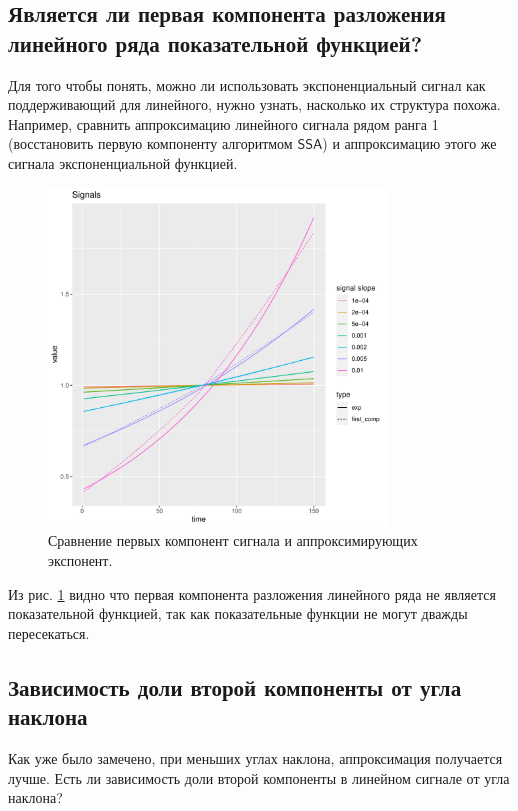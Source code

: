 \documentclass[specialist, substylefile = spbureport.rtx,
    subf,href,colorlinks=true, 12pt]{disser}
\newcommand{\SSA}{\mathsf{SSA}}
\begin{document}
    \subsection{Является ли первая компонента разложения линейного ряда показательной функцией?}
        Для того чтобы понять, можно ли использовать экспоненциальный сигнал как поддерживающий для линейного, нужно узнать, насколько их структура похожа. Например, сравнить аппроксимацию линейного сигнала рядом ранга 1 (восстановить первую компоненту алгоритмом $\SSA$) и аппроксимацию этого же сигнала экспоненциальной функцией.

        \begin{figure}[h]
            \centering
            \includegraphics[width=0.8\textwidth]{experiment_3_linefirstcomp.pdf}
            \caption{Сравнение первых компонент сигнала и аппроксимирующих экспонент.}
            \label{fig:exp3_linefirstcomp}
        \end{figure}

        Из рис. \ref{fig:exp3_linefirstcomp} видно что первая компонента разложения линейного ряда не является показательной функцией, так как показательные функции не могут дважды пересекаться.

    \subsection{Зависимость доли второй компоненты от угла наклона}

        Как уже было замечено, при меньших углах наклона, аппроксимация получается лучше. Есть ли зависимость доли второй компоненты в линейном сигнале от угла наклона?
\end{document}
